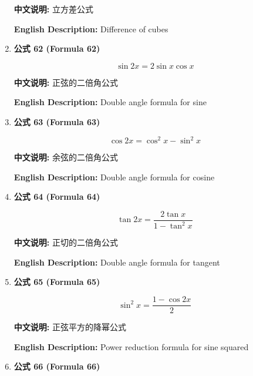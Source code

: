 \documentclass[12pt,a4paper]{article}
\begin{document}
\begin{enumerate}[leftmargin=*]
\textbf{中文说明:} 立方差公式

\textbf{English Description:} Difference of cubes

\vspace{0.5cm}

\item \textbf{公式 62 (Formula 62)}

\begin{equation}
\sin 2x = 2 \sin x \cos x
\end{equation}

\textbf{中文说明:} 正弦的二倍角公式

\textbf{English Description:} Double angle formula for sine

\vspace{0.5cm}

\item \textbf{公式 63 (Formula 63)}

\begin{equation}
\cos 2x = \cos^2 x - \sin^2 x
\end{equation}

\textbf{中文说明:} 余弦的二倍角公式

\textbf{English Description:} Double angle formula for cosine

\vspace{0.5cm}

\item \textbf{公式 64 (Formula 64)}

\begin{equation}
\tan 2x = \frac{2\tan x}{1 - \tan^2 x}
\end{equation}

\textbf{中文说明:} 正切的二倍角公式

\textbf{English Description:} Double angle formula for tangent

\vspace{0.5cm}

\item \textbf{公式 65 (Formula 65)}

\begin{equation}
\sin^2 x = \frac{1 - \cos 2x}{2}
\end{equation}

\textbf{中文说明:} 正弦平方的降幂公式

\textbf{English Description:} Power reduction formula for sine squared

\vspace{0.5cm}

\item \textbf{公式 66 (Formula 66)}


\end{enumerate}
\end{document}
